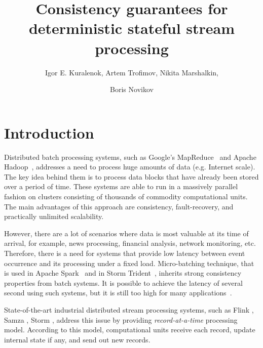 \documentclass{llncs}
\begin{document}
\title {Consistency guarantees for deterministic stateful stream processing}

\author{Igor E. Kuralenok, Artem Trofimov, Nikita Marshalkin, \and Boris Novikov}

\begin{abstract}
\end{abstract}

\maketitle

\section {Introduction}
Distributed batch processing systems, such as Google's MapReduce~\cite{Dean:2008:MSD:1327452.1327492} and Apache Hadoop~\cite{hadoop2009hadoop}, addresses a need to process huge amounts of data (e.g. Internet scale). The key idea behind them is to process data blocks that have already been stored over a period of time. These systems are able to run in a massively parallel fashion on clusters consisting of thousands of commodity computational units. The main advantages of this approach are consistency, fault-recovery, and practically unlimited scalability.

However, there are a lot of scenarios where data is most valuable at its time of arrival, for example, news processing, financial analysis, network monitoring, etc. Therefore, there is a need for systems that provide low latency between event occurrence and its processing under a fixed load. Micro-batching technique, that is used in Apache Spark~\cite{Zaharia:2012:DSE:2342763.2342773} and in Storm Trident~\cite{apache:storm:trident}, inherits strong consistency properties from batch systems. It is possible to achieve the latency of several second using such systems, but it is still too high for many applications~\cite{?}.

State-of-the-art industrial distributed stream processing systems, such as Flink \cite{carbone2015apache}, Samza \cite{Noghabi:2017:SSS:3137765.3137770}, Storm \cite{apache:storm}, address this issue by providing {\it record-at-a-time} processing model. According to this model, computational units receive each record, update internal state if any, and send out new records. 
\end{document}
